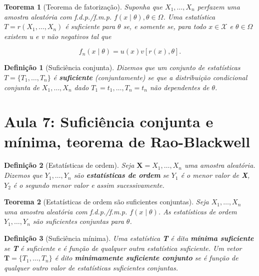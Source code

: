 \documentclass{article}
\newtheorem{theorem}{Teorema}
\newtheorem{definition}{Definição}
\begin{document}
	\begin{theorem}[Teorema de fatorização]\label{teo:fatorizacao}
		Suponha que $X_1, \ldots, X_n$ perfazem uma amostra aleatória com f.d.p./f.m.p. $f(x \mid \theta), \theta \in \Omega$. Uma estatística $T = r(X_1, \ldots, X_n)$ é suficiente para $\theta$ se, e somente se, para todo $x \in \mathcal{X}$ e $\theta \in \Omega$ existem u e v não negativos tal que
		
		\begin{equation}
			f_n(x \mid \theta) = u(x) v[r(x), \theta].
		\end{equation}
	\end{theorem}
	
	\begin{definition}[Suficiência conjunta]
		Dizemos que um conjunto de estatísticas $T = \{T_1, \ldots, T_n\}$ é \textbf{suficiente} (conjuntamente) se que a distribuição condicional conjunta de $X_1, \ldots, X_n$ dado $T_1 = t_1, \ldots, T_n = t_n$ não dependentes de $\theta$.
	\end{definition}
	
	\section*{Aula 7: Suficiência conjunta e mínima, teorema de Rao-Blackwell}
	\label{s7}
	\begin{definition}[Estatísticas de ordem]
		Seja $\textbf{X} = X_1, \ldots, X_n$ uma amostra aleatória. Dizemos que $Y_1, \ldots, Y_n$ são \textbf{estatísticas de ordem} se $Y_1$ é o menor valor de \textbf{X}, $Y_2$ é o segundo menor valor e assim sucessivamente.
	\end{definition}
	
	\begin{theorem}[Estatísticas de ordem são suficientes conjuntas]
		Seja $X_1, \ldots, X_n$ uma amostra aleatória com f.d.p./f.m.p. $f(x \mid \theta)$. As estatísticas de ordem $Y_1, \ldots, Y_n$ são suficientes conjuntas para $\theta$.
	\end{theorem}
	
	\begin{definition}[Suficiência mínima]
		Uma estatística \textbf{T} é dita \textbf{mínima suficiente} se \textbf{T} é suficiente e é função de qualquer outra estatística suficiente. Um vetor $\textbf{T} = \{ T_1, \ldots, T_n \}$ é dito \textbf{minimamente suficiente conjunto} se é função de qualquer outro valor de estatísticas suficientes conjuntas.
	\end{definition}
	
\end{document}
